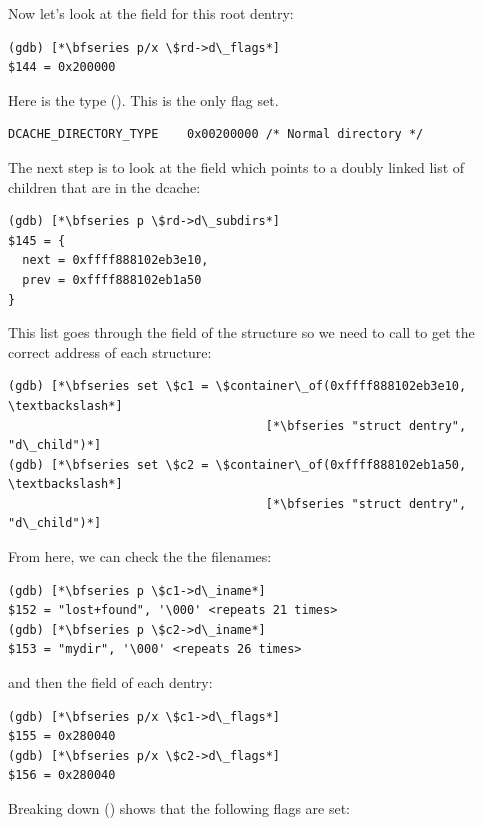 \noindent
Now let's look at the  field for this root dentry:

\begin{lstlisting}
(gdb) [*\bfseries p/x \$rd->d\_flags*]
$144 = 0x200000
\end{lstlisting}

\noindent
Here is the type (). This is the only flag set.

\noindent
\begin{lstlisting}
DCACHE_DIRECTORY_TYPE    0x00200000 /* Normal directory */
\end{lstlisting}

\noindent
The next step is to look at the  field which points to a doubly linked list of children that are in the dcache:

\begin{lstlisting}
(gdb) [*\bfseries p \$rd->d\_subdirs*]
$145 = {
  next = 0xffff888102eb3e10,
  prev = 0xffff888102eb1a50
}
\end{lstlisting}

\noindent
This list goes through the  field of the  structure so we need to call  to get the correct address of each structure:

\begin{lstlisting}
(gdb) [*\bfseries set \$c1 = \$container\_of(0xffff888102eb3e10, \textbackslash*]
                                    [*\bfseries "struct dentry", "d\_child")*]
(gdb) [*\bfseries set \$c2 = \$container\_of(0xffff888102eb1a50,  \textbackslash*]
                                    [*\bfseries "struct dentry", "d\_child")*]
\end{lstlisting}

\noindent
From here, we can check the the filenames:

\begin{lstlisting}
(gdb) [*\bfseries p \$c1->d\_iname*]
$152 = "lost+found", '\000' <repeats 21 times>
(gdb) [*\bfseries p \$c2->d\_iname*]
$153 = "mydir", '\000' <repeats 26 times>
\end{lstlisting}

\noindent
and then the  field of each dentry:

\begin{lstlisting}
(gdb) [*\bfseries p/x \$c1->d\_flags*]
$155 = 0x280040
(gdb) [*\bfseries p/x \$c2->d\_flags*]
$156 = 0x280040
\end{lstlisting}

\noindent
Breaking down  () shows that the following flags are set:

